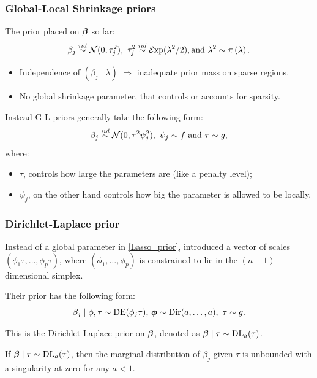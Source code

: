 \documentclass[10pt]{beamer}
\theoremstyle{plain}
\def\heading#1{\begin{center} \Large\bf{\color{DarkBlue} #1}
\end{center} } %
\newcommand{\blankline}{\quad\pagebreak[3]}
\begin{document}
\begin{frame}
	\frametitle{Global-Local Shrinkage priors}
	The prior placed on $\boldsymbol{\beta}$ so far:\begin{equation} \label{Lasso_prior}
\beta_j \stackrel{iid}{\sim} \NormRV(0 , \tau_j^2), \ \tau_j^2  \stackrel{iid}{\sim} \mathcal{E}\mathrm{xp}(\lambda^2/2), \text{and } \lambda^2 \sim \pi \left(\lambda \right). 
\end{equation}
\begin{itemize}
	\item Independence of $(\beta_j \mid \lambda)$ $\Rightarrow$ inadequate prior mass on sparse regions.
	\item No global shrinkage parameter, that controls or accounts for sparsity.
\end{itemize}
\blankline
Instead G-L priors generally take the following form:\[ \beta_j \stackrel{iid}{\sim} \mathcal{N}(0 , \tau^2 \psi_j^2), \ \psi_j \sim f \mbox{ and} \ \tau \sim g, \]
where:
\begin{itemize}
	\item $\tau$, controls how large the parameters are (like a penalty level);
	\item $\psi_j$, on the other hand  controls how big the parameter is allowed to be locally.
\end{itemize}
\end{frame}
\begin{frame}
	\frametitle{Dirichlet-Laplace prior}
	Instead of a global parameter in \eqref{Lasso_prior}, \cite{bhattacharya2014dirichlet} introduced a vector of scales $\left( \phi_1 \tau , \ldots , \phi_p \tau \right)$, where $ \left( \phi_1 , \ldots , \phi_p \right) $ is constrained to lie in the $ (n - 1) $ dimensional simplex. 
	
	Their prior has the following form:
	$$ \beta_j \mid \phi , \tau \sim \text{\rm{DE}}(\phi_j \tau), \, \boldsymbol{\phi} \sim \text{\rm{Dir}}(a, \ldots ,a), \ \tau \sim g.$$ 
	
	This is the Dirichlet-Laplace prior on $\boldsymbol{\beta}$, denoted as $\boldsymbol{\beta} \mid \tau \sim \text{\rm{DL}}_a(\tau)$.
	\blankline
	
	
\begin{proposition}\label{DL_prior_carac}
If $\boldsymbol{\beta} \mid \tau \sim \text{\rm{DL}}_a(\tau)$, then the marginal distribution of $\beta_j$ given $\tau$ is unbounded with a singularity at zero for any $a < 1$.
\end{proposition}
\end{frame}
\end{document}
